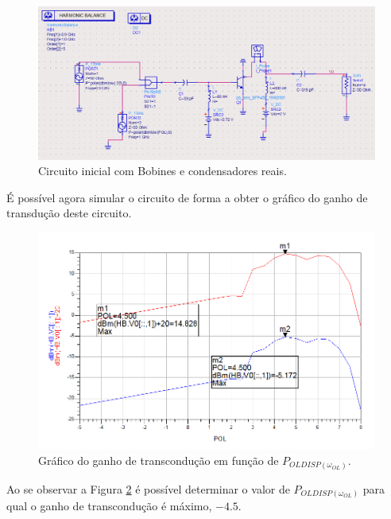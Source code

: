 \documentclass[11pt]{article}
\numberwithin{equation}{section}
\begin{document}
\begin{figure}[H]
	\centering
	\includegraphics[keepaspectratio=true, scale=0.45]{exps/Circuito_2c}
	\vspace{-0.5em}
	\caption{Circuito inicial com Bobines e condensadores reais.}
	\vspace{-0.8em}
	\label{fig:Circuito_0}
\end{figure}

É possível agora simular o circuito de forma a obter o gráfico do ganho de transdução deste circuito.

\begin{figure}[H]
	\centering
	\includegraphics[keepaspectratio=true, scale=0.45]{exps/GT_0}
	\vspace{-0.5em}
	\caption{Gráfico do ganho de transcondução em função de $ P_{OLDISP(\omega_{OL})} $.}
	\vspace{-0.8em}
	\label{fig:GT_0}
\end{figure}

Ao se observar a Figura \ref{fig:GT_0} é possível determinar o valor de $ P_{OLDISP(\omega_{OL})} $ para qual o ganho de transcondução é máximo, $ -4.5 $.
\end{document}
